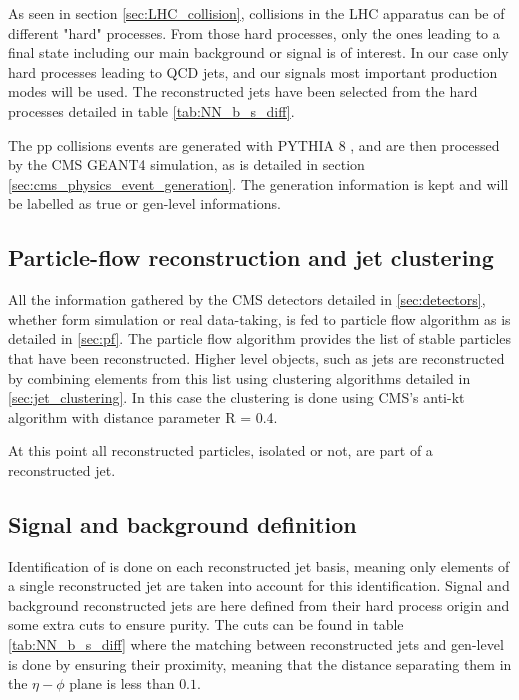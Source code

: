 As seen in section \ref{sec:LHC_collision}, collisions in the LHC apparatus can be of different "hard" processes. From those hard processes, only the ones leading to a final state including our main background or signal is of interest. 
In our case only hard processes leading to QCD jets, and our signals most important production modes will be used.
The reconstructed jets have been selected from the hard processes detailed in table \ref{tab:NN_b_s_diff}.

The pp collisions events are generated with PYTHIA 8 \cite{pythia}, and are then processed by the CMS GEANT4 simulation, as is detailed in section \ref{sec:cms_physics_event_generation}.
The generation information is kept and will be labelled as true or gen-level informations.

\subsection{Particle-flow reconstruction and jet clustering}
\label{sec:NN_datasets_pf}
All the information gathered by the CMS detectors detailed in \ref{sec:detectors}, whether form simulation or real data-taking, is fed to particle flow algorithm as is detailed in \ref{sec:pf}.
The particle flow algorithm provides the list of stable particles that have been reconstructed. Higher level objects, such as jets are reconstructed by combining elements from this list using clustering algorithms detailed in \ref{sec:jet_clustering}.
In this case the clustering is done using CMS's anti-kt algorithm with distance parameter R = 0.4.

At this point all reconstructed particles, isolated or not, are part of a reconstructed jet.

\subsection{Signal and background definition}
\label{sec:NN_datasets_s_b_def}

Identification of \tauh is done on each reconstructed jet basis, meaning only elements of a single reconstructed jet are taken into account for this identification. 
Signal and background reconstructed jets are here defined from their hard process origin and some extra cuts to ensure purity.
The cuts can be found in table \ref{tab:NN_b_s_diff} where the matching between reconstructed jets and gen-level \tauh is done by ensuring their proximity, meaning that the distance separating them in the $\eta-\phi$ plane is less than $0.1$.

